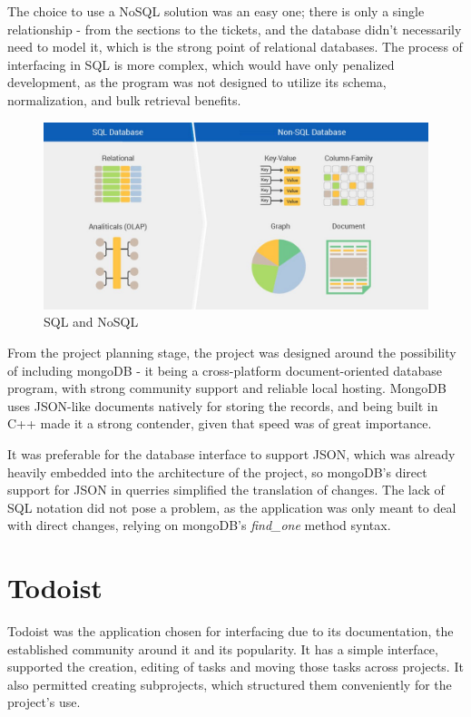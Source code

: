 \documentclass[12pt]{report}
\theoremstyle{definition}
\theoremstyle{remark}
\begin{document}
The choice to use a NoSQL solution was an easy one; there is only a single relationship - from the sections to the tickets, and the database didn't necessarily need to model it, which is the strong point of relational databases. The process of interfacing in SQL is more complex, which would have only penalized development, as the program was not designed to utilize its schema, normalization, and bulk retrieval benefits.

\begin{figure}[h]
    \centering
    \includegraphics[width=\textwidth]{img/stock/sql_vs_nosql.JPG}
    \caption{SQL and NoSQL}
    \label{fig:sql_vs_nosql}
\end{figure}


From the project planning stage, the project was designed around the possibility of including mongoDB - it being a cross-platform document-oriented database program, with strong community support and reliable local hosting. MongoDB uses JSON-like documents natively for storing the records, and being built in C++ made it a strong contender, given that speed was of great importance. 

It was preferable for the database interface to support JSON, which was already heavily embedded into the architecture of the project, so mongoDB's direct support for JSON in querries simplified the translation of changes. The lack of SQL notation did not pose a problem, as the application was only meant to deal with direct changes, relying on mongoDB's \textit{find\_one} method syntax.

\section{Todoist}
Todoist was the application chosen for interfacing due to its documentation, the established community around it and its popularity. It has a simple interface, supported the creation, editing of tasks and moving those tasks across projects. It also permitted creating subprojects, which structured them conveniently for the project's use.
\end{document}
